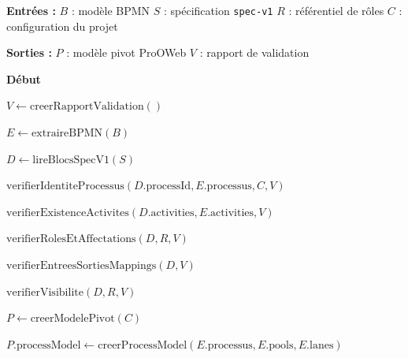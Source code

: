 \begin{algorithm}[H]
\footnotesize
\DontPrintSemicolon
\SetAlgoLined
{}
\SetInd{0.4em}{0.8em}

\caption{TransformationM2M($B,S,R,C$)}
\label{alg:m2m}

\textbf{Entrées :}\;
\Indp
$B$ : modèle BPMN\;
$S$ : spécification \texttt{spec-v1}\;
$R$ : référentiel de rôles\;
$C$ : configuration du projet\;
\Indm

\textbf{Sorties :}\;
\Indp
$P$ : modèle pivot ProOWeb\;
$V$ : rapport de validation\;
\Indm

\textbf{Début}\;

$V \leftarrow \mathrm{creerRapportValidation}()$\;

$E \leftarrow \mathrm{extraireBPMN}(B)$\;

$D \leftarrow \mathrm{lireBlocsSpecV1}(S)$\;

$\mathrm{verifierIdentiteProcessus}(D.\mathrm{processId},E.\mathrm{processus},C,V)$\;

$\mathrm{verifierExistenceActivites}(D.\mathrm{activities},E.\mathrm{activities},V)$\;

$\mathrm{verifierRolesEtAffectations}(D,R,V)$\;

$\mathrm{verifierEntreesSortiesMappings}(D,V)$\;

$\mathrm{verifierVisibilite}(D,R,V)$\;


$P \leftarrow \mathrm{creerModelePivot}(C)$\;

$P.\mathrm{processModel} \leftarrow
\mathrm{creerProcessModel}(E.\mathrm{processus},E.\mathrm{pools},E.\mathrm{lanes})$\;



\end{algorithm}
